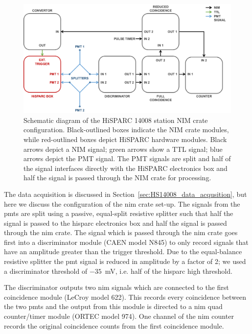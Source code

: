 \begin{figure}[ht!]
	\centering
	\includegraphics[width=\columnwidth]{14008_nim_config.png}
	\caption{Schematic diagram of the HiSPARC 14008 station NIM crate configuration. Black-outlined boxes indicate the NIM crate modules, while red-outlined boxes depict HiSPARC hardware modules. Black arrows depict a NIM signal; green arrows show a TTL signal; blue arrows depict the PMT signal. The PMT signals are split and half of the signal interfaces directly with the HiSPARC electronics box and half the signal is passed through the NIM crate for processing.}
	\label{fig:14008_NIM}
\end{figure}

The data acquisition is discussed in Section~\ref{sec:HS14008_data_acqusition}, but here we discuss the configuration of the \gls{nim} crate set-up. The signals from the \glspl{pmt} are split using a passive, equal-split resistive splitter such that half the signal is passed to the \gls{hisparc} electronics box and half the signal is passed through the \gls{nim} crate. The signal which is passed through the \gls{nim} crate goes first into a discriminator module (CAEN model N845) to only record signals that have an amplitude greater than the trigger threshold. Due to the equal-balance resistive splitter the \gls{pmt} signal is reduced in amplitude by a factor of 2; we used a discriminator threshold of $-35$~mV, i.e. half of the \gls{hisparc} high threshold.

The discriminator outputs two \gls{nim} signals which are connected to the first coincidence module (LeCroy model 622). This records every coincidence between the two \glspl{pmt} and the output from this module is directed to a \gls{nim} quad counter/timer module (ORTEC model 974). One channel of the \gls{nim} counter records the original coincidence counts from the first coincidence module.

